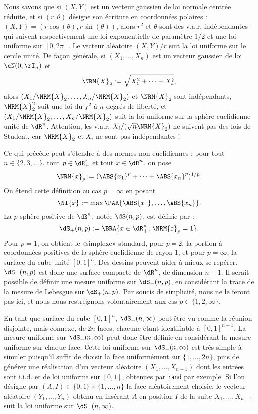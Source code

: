 Nous savons que si $(X,Y)$ est un vecteur gaussien de loi normale centrée
réduite, et si $(r,\theta)$ désigne son écriture en coordonnées polaires :
$(X,Y)=(r\cos(\theta),r\sin(\theta))$, alors $r^2$ et $\theta$ sont des v.a.r. indépendantes
qui suivent respectivement une loi exponentielle de paramètre $1/2$ et une loi
uniforme sur $[0,2\pi]$. Le vecteur aléatoire $(X,Y)/r$ suit la loi uniforme sur
le cercle unité. De façon générale, si $(X_1,\ldots,X_n)$ est un vecteur gaussien
de loi $\cN(0,\rI_n)$ et
$$
\NRM{X}_2:=\sqrt{X_1^2+\cdots+X_n^2},
$$
alors $(X_1/\NRM{X}_2,\ldots,X_n/\NRM{X}_2)$ et $\NRM{X}_2$ sont
indépendants, $\NRM{X}_2^2$ suit une loi du $\chi^2$ à $n$ degrés de liberté,
et $(X_1/\NRM{X}_2,\ldots,X_n/\NRM{X}_2)$ suit la loi uniforme sur la sphère
euclidienne unité de $\dR^n$. Attention, les v.a.r. $X_i/(\sqrt{n}\NRM{X}_2)$
ne suivent pas des lois de Student, car $\NRM{X}_2$ et $X_i$ ne sont pas
indépendantes !

Ce qui précède peut s'étendre à des normes non euclidiennes : pour tout
$n\in\{2,3,\ldots\}$, tout $p\in\dR_+^*$ et tout $x\in\dR^n$, on pose
$$
\NRM{x}_p:=(\ABS{x_1}^p+\cdots+\ABS{x_n}^p)^{1/p}.
$$ 
On étend cette définition au cas $p=\infty$ en posant
$$
\NI{x}:=\max\PAR{\ABS{x_1},\ldots,\ABS{x_n}}.
$$
La $p$-sphère positive de $\dR^n$, notée $\dS(n,p)$, est définie par :
$$
\dS_+(n,p):=\BRA{x\in\dR_+^n,\,\NRM{x}_p=1}.
$$
Pour $p=1$, on obtient le «simplexe» standard, pour $p=2$, la portion à
coordonnées positives de la sphère euclidienne de rayon $1$, et pour
$p=\infty$, la surface du cube unité $[0,1]^n$.  Des dessins peuvent aider à
mieux se repérer. $\dS_+(n,p)$ est donc une surface compacte de $\dR^n$, de
dimension $n-1$.  Il serait possible de définir une mesure uniforme sur
$\dS_+(n,p)$, en considérant la trace de la mesure de Lebesgue sur
$\dS_+(n,p)$. Par soucis de simplicité, nous ne le feront pas ici, et nous
nous restreignons volontairement aux cas $p\in\{1,2,\infty\}$.

En tant que surface du cube $[0,1]^n$, $\dS_+(n,\infty)$ peut être vu comme la
réunion disjointe, mais connexe, de $2n$ faces, chacune étant identifiable à
$[0,1]^{n-1}$. La mesure uniforme sur $\dS_+(n,\infty)$ peut donc être définie
en considérant la mesure uniforme sur chaque face. Cette loi uniforme sur
$\dS_+(n,\infty)$ est très simple à simuler puisqu'il suffit de choisir la
face uniformément sur $\{1,\ldots,2n\}$, puis de générer une réalisation d'un
vecteur aléatoire $(X_1,\ldots,X_{n-1})$ dont les entrées sont i.i.d. et de
loi uniforme sur $[0,1]$, obtenues par \texttt{rand} par exemple.  Si l'on
désigne par $(A,I)\in\{0,1\}×\{1,\ldots,n\}$ la face aléatoirement
choisie, le vecteur aléatoire $(Y_1,\ldots,Y_n)$ obtenu en insérant $A$ en
position $I$ de la suite $X_1,\ldots,X_{n-1}$ suit la loi uniforme sur
$\dS_+(n,\infty)$.

